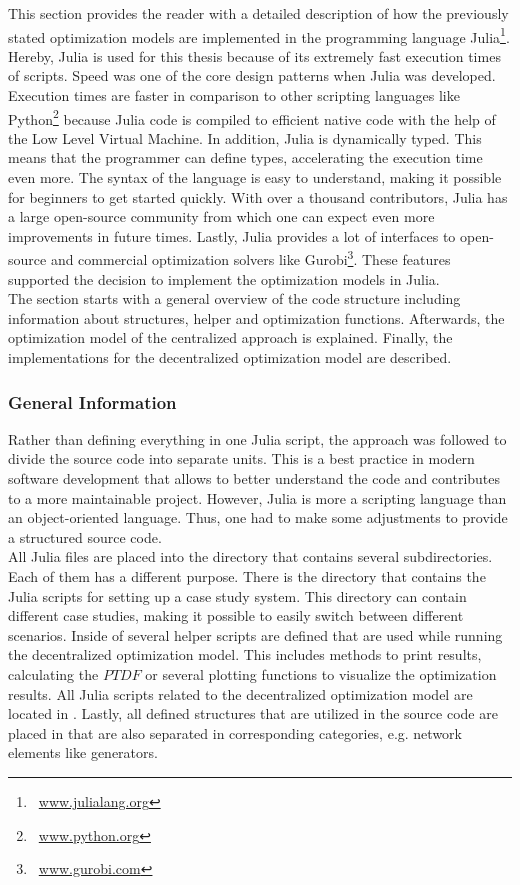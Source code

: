 This section provides the reader with a detailed description of how the previously stated optimization models are implemented in the programming language Julia\footnote{~\url{www.julialang.org}}. Hereby, Julia is used for this thesis because of its extremely fast execution times of scripts. Speed was one of the core design patterns when Julia was developed. Execution times are faster in comparison to other scripting languages like Python\footnote{~\url{www.python.org}} because Julia code is compiled to efficient native code with the help of the Low Level Virtual Machine. In addition, Julia is dynamically typed. This means that the programmer can define types, accelerating the execution time even more. The syntax of the language is easy to understand, making it possible for beginners to get started quickly. With over a thousand contributors, Julia has a large open-source community from which one can expect even more improvements in future times. Lastly, Julia provides a lot of interfaces to open-source and commercial optimization solvers like Gurobi\footnote{~\url{www.gurobi.com}}. These features supported the decision to implement the optimization models in Julia. \\

The section starts with a general overview of the code structure including information about structures, helper and optimization functions. Afterwards, the optimization model of the centralized approach is explained. Finally, the implementations for the decentralized optimization model are described.

\subsubsection{General Information}

Rather than defining everything in one Julia script, the approach was followed to divide the source code into separate units. This is a best practice in modern software development that allows to better understand the code and contributes to a more maintainable project. However, Julia is more a scripting language than an object-oriented language. Thus, one had to make some adjustments to provide a structured source code.\\ 

All Julia files are placed into the directory  that contains several subdirectories. Each of them has a different purpose. There is the  directory that contains the Julia scripts for setting up a case study system. This directory can contain different case studies, making it possible to easily switch between different scenarios. Inside of  several helper scripts are defined that are used while running the decentralized optimization model. This includes methods to print results, calculating the $PTDF$ or several plotting functions to visualize the optimization results. All Julia scripts related to the decentralized optimization model are located in . Lastly, all defined structures that are utilized in the source code are placed in  that are also separated in corresponding categories, e.g. network elements like generators.\\


